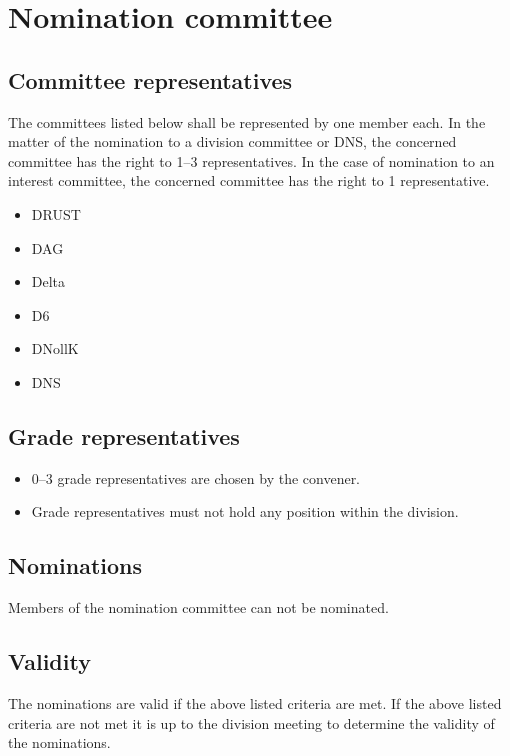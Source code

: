 \section{Nomination committee}
\subsection{Committee representatives}
The committees listed below shall be represented by one member each. In the matter of the nomination to a division committee or DNS, the concerned committee has the right to 1--3 representatives. In the case of nomination to an interest committee, the concerned committee has the right to 1 representative. 

\begin{itemize}
  \item DRUST 
  \item DAG 
  \item Delta 
  \item D6 
  \item DNollK
  \item DNS
\end{itemize}

\subsection{Grade representatives}
\begin{itemize}
  \item 0--3 grade representatives are chosen by the convener. 
  \item Grade representatives must not hold any position within the division. 
\end{itemize}
\subsection{Nominations}
Members of the nomination committee can not be nominated. 

\subsection{Validity}
The nominations are valid if the above listed criteria are met. If the above listed criteria are not met it is up to the division meeting to determine the validity of the nominations. 
